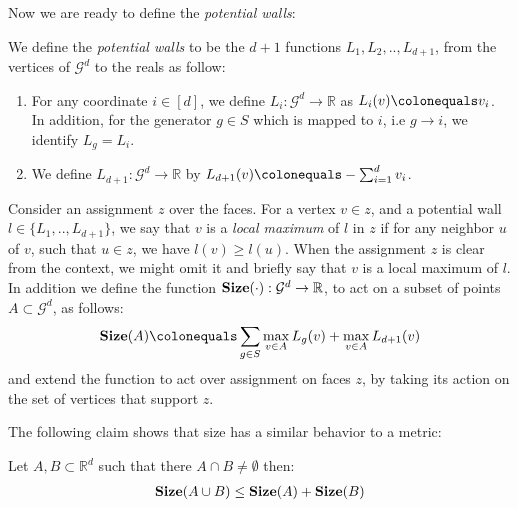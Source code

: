 Now we are ready to define the \textit{potential walls}:
\begin{definition}
  We define the \textit{potential walls} to be the $d+1$ functions $L_{1},L_{2},..,L_{d+1}$, from the vertices of $\mathcal{G}^{d}$ to the reals as follow:
  \begin{enumerate}
    \item For any coordinate $i \in [d]$, we define $L_{i} \colon \mathcal{G}^{d} \rightarrow \mathbb{R}$ as $L_{i}(v) \colonequals v_{i}$. In addition, for the generator $g \in S$ which is mapped to $i$, i.e $g \rightarrow i $, we identify $L_{g} = L_{i}$. 
    \item We define $L_{d+1} \colon \mathcal{G}^{d} \rightarrow \mathbb{R}$ by $L_{d+1}(v) \colonequals -\sum_{i = 1}^{d}v_{i}$.
  \end{enumerate}
  Consider an assignment $z$ over the faces. For a vertex $v \in z$, and a potential wall $l \in \{ L_{1},..,L_{d+1}\} $, we say that $v$ is a \textit{local maximum} of $l$ in $z$ if for any neighbor $u$ of $v$, such that $u \in z$, we have $l(v) \ge l(u)$. When the assignment $z$ is clear from the context, we might omit it and briefly say that $v$ is a local maximum of $l$. In addition we define the function $\mathbf{Size}( \cdot ) : \mathcal{G}^{d} \rightarrow \mathbb{R} $, to act on a subset of points $A \subset \mathcal{G}^{d}$, as follows:   
  \begin{equation*}
    \begin{split}
      \Size{A} \colonequals \sum_{g \in S}\max_{v \in A}L_{g}(v) + \max_{v \in A}L_{d+1}(v) 
    \end{split}
  \end{equation*}
and extend the function to act over assignment on faces $z$, by taking its action on the set of vertices that support $z$.
\end{definition}
The following claim shows that size has a similar behavior to a metric:
\begin{claim}
  \label{claim:tringinq}
  Let $A,B \subset \mathbb{R}^{d}$ such that there $A \cap B \neq \emptyset$ then: 
  \begin{equation*}
    \begin{split}
      \mathbf{Size}(A\cup B) \le \mathbf{Size}(A) + \mathbf{Size}(B)
    \end{split}
  \end{equation*}
\end{claim}
